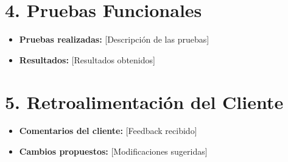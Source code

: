 \documentclass[12pt, a4paper]{article}
\begin{document}
\section*{4. Pruebas Funcionales}
\begin{itemize}
    \item \textbf{Pruebas realizadas:} [Descripción de las pruebas]
    \item \textbf{Resultados:} [Resultados obtenidos]
\end{itemize}

\section*{5. Retroalimentación del Cliente}
\begin{itemize}
    \item \textbf{Comentarios del cliente:} [Feedback recibido]
    \item \textbf{Cambios propuestos:} [Modificaciones sugeridas]
\end{itemize}
\end{document}
